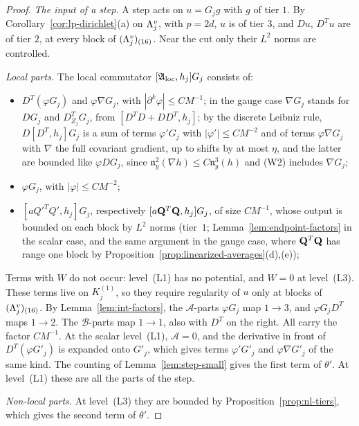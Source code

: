 \begin{proof}
\emph{The input of a step.} A step acts on $u=G_jg$ with $g$ of tier $1$. By Corollary~\ref{cor:lp-dirichlet}(a) on $\Lambda^v_j$, with $p=2d$, $u$ is of tier $3$, and $Du$, $D^Tu$ are of tier $2$, at every block of $(\Lambda^v_j)_{(16)}$. Near the cut only their $L^2$ norms are controlled.

\emph{Local parts.} The local commutator $[\mathfrak A_{\rm loc},h_j]G_j$ consists of:
\begin{itemize}
\item $D^T(\varphi G_j)$ and $\varphi\nabla G_j$, with $|\partial^k\varphi|\le CM^{-1}$; in the gauge case $\nabla G_j$ stands for $DG_j$ and $D^T_{Z_j}G_j$, from $[D^TD+DD^T,h_j]$; by the discrete Leibniz rule, $D[D^T,h_j]G_j$ is a sum of terms $\varphi'G_j$ with $|\varphi'|\le CM^{-2}$ and of terms $\varphi\nabla G_j$ with $\nabla$ the full covariant gradient, up to shifts by at most $\eta$, and the latter are bounded like $\varphi DG_j$, since $\mathfrak n^2_y(\nabla h)\le C\mathfrak n^3_y(h)$ and (W2) includes $\nabla G_j$;
\item $\varphi G_j$, with $|\varphi|\le CM^{-2}$;
\item $[aQ'^TQ',h_j]G_j$, respectively $[a\mathbf Q^T\mathbf Q,h_j]G_j$, of size $CM^{-1}$, whose output is bounded on each block by $L^2$ norms (tier~$1$; Lemma~\ref{lem:endpoint-factors} in the scalar case, and the same argument in the gauge case, where $\mathbf Q^T\mathbf Q$ has range one block by Proposition~\ref{prop:linearized-averages}(d),(e));
\end{itemize}
Terms with $W$ do not occur: level~(L1) has no potential, and $W=0$ at level~(L3). These terms live on $K_j^{(1)}$, so they require regularity of $u$ only at blocks of $(\Lambda^v_j)_{(16)}$. By Lemma~\ref{lem:int-factors}, the $\mathcal A$-parts $\varphi G_j$ map $1\to3$, and $\varphi G_jD^T$ maps $1\to2$. The $\mathcal B$-parts map $1\to1$, also with $D^T$ on the right. All carry the factor $CM^{-1}$. At the scalar level~(L1), $\mathcal A=0$, and the derivative in front of $D^T(\varphi G'_j)$ is expanded onto $G'_j$, which gives terms $\varphi'G'_j$ and $\varphi\nabla G'_j$ of the same kind. The counting of Lemma~\ref{lem:step-small} gives the first term of $\theta'$. At level~(L1) these are all the parts of the step.

\emph{Non-local parts.} At level~(L3) they are bounded by Proposition~\ref{prop:nl-tiers}, which gives the second term of $\theta'$.


\end{proof}
